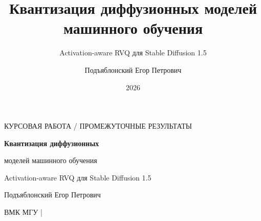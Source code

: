 \documentclass[aspectratio=169,10pt]{beamer}
\title{Квантизация диффузионных моделей машинного обучения}
\subtitle{Activation-aware RVQ для Stable Diffusion 1.5}
\author{Подъяблонский Егор Петрович}
\institute{ВМК МГУ}
\date{2026}
\begin{document}

\begin{frame}[plain]
  \vspace{3mm}

  {\color{Accent}\small
    КУРСОВАЯ РАБОТА
    \quad / \quad
    ПРОМЕЖУТОЧНЫЕ РЕЗУЛЬТАТЫ
    \par
  }

  \vspace{7mm}

  {\LARGE\bfseries
    Квантизация диффузионных\par
    моделей машинного обучения\par
  }

  \vspace{4mm}

  {\large
    Activation-aware RVQ для Stable Diffusion 1.5
    \par
  }

  \vfill

  {\normalsize
    Подъяблонский Егор Петрович\par
  }

  \vspace{2mm}

  {\small\color{Muted}
    ВМК МГУ \quad | \par
  }

  \vspace{3mm}
\end{frame}

\end{document}
